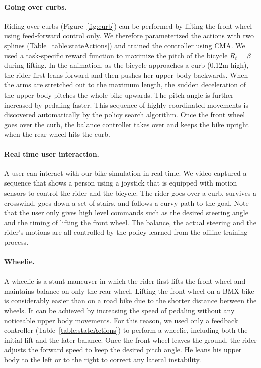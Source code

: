 \paragraph{Going over curbs.} Riding over curbs (Figure~\ref{fig:curb}) can be performed by lifting the front wheel using feed-forward control only. We therefore parameterized the actions with two splines (Table~\ref{table:stateActions}) and trained the controller using CMA. We used a task-specific reward function to maximize the pitch of the bicycle $R_t = \beta$ during lifting. In the animation, as the bicycle approaches a curb (0.12m high), the rider first leans forward and then pushes her upper body backwards. When the arms are stretched out to the maximum length, the sudden deceleration of the upper body pitches the whole bike upwards. The pitch angle is further increased by pedaling faster. This sequence of highly coordinated movements is discovered automatically by the policy search algorithm. Once the front wheel goes over the curb, the balance controller takes over and keeps the bike upright when the rear wheel hits the curb.
\vspace{-0.05in}

\paragraph{Real time user interaction.} A user can interact with our bike simulation in real time. We video captured a sequence that shows a person using a joystick that is equipped with motion sensors to control the rider and the bicycle. The rider goes over a curb, survives a crosswind, goes down a set of stairs, and follows a curvy path to the goal. Note that the user only gives high level commands such as the desired steering angle and the timing of lifting the front wheel. The balance, the actual steering and the rider's motions are all controlled by the policy learned from the offline training process.
\vspace{-0.05in}

\paragraph{Wheelie.} A wheelie is a stunt maneuver in which the rider first lifts the front wheel and maintains balance on only the rear wheel. Lifting the front wheel on a BMX bike is considerably easier than on a road bike due to the shorter distance between the wheels. It can be achieved by increasing the speed of pedaling without any noticeable upper body movements. For this reason, we used only a feedback controller (Table~\ref{table:stateActions}) to perform a wheelie, including both the initial lift and the later balance. Once the front wheel leaves the ground, the rider adjusts the forward speed to keep the desired pitch angle. He leans his upper body to the left or to the right to correct any lateral instability.
\vspace{-0.05in}

